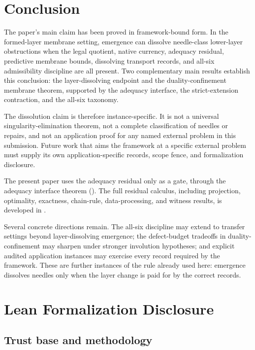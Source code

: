 \documentclass[11pt]{article}
\theoremstyle{definition}
\begin{document}
 

\section{Conclusion}
\label{sec:conclusion}

The paper's main claim has been proved in framework-bound form.  In
the formed-layer membrane setting, emergence can dissolve needle-class
lower-layer obstructions when the legal quotient, native currency,
adequacy residual, predictive membrane bounds, dissolving transport
records, and all-six admissibility discipline are all present.  Two
complementary main results establish this conclusion: the layer-dissolving
endpoint and the duality-confinement membrane theorem, supported by
the adequacy interface, the strict-extension contraction, and the
all-six taxonomy.

The dissolution claim is therefore instance-specific.  It is not a
universal singularity-elimination theorem, not a complete
classification of needles or repairs, and not an application proof for
any named external problem in this submission.  Future work that aims
the framework at a specific external problem must supply its own
application-specific records, scope fence, and formalization disclosure.

The present paper uses the adequacy residual only as a gate, through
the adequacy interface theorem ().  The full residual
calculus, including projection, optimality, exactness, chain-rule,
data-processing, and witness results, is developed in
\citet{Tsiokos2026XiCompanion}.

Several concrete directions remain.  The all-six discipline may extend
to transfer settings beyond layer-dissolving emergence; the
defect-budget tradeoffs in duality-confinement may sharpen under
stronger involution hypotheses; and explicit audited application
instances may exercise every record required by the framework.  These
are further instances of the rule already used here: emergence
dissolves needles only when the layer change is paid for by the
correct records.

 
\appendix
\section{Lean Formalization Disclosure}
\label{app:formalization}

\subsection{Trust base and methodology}
\label{subsec:paper1-trust-methodology}
\end{document}
